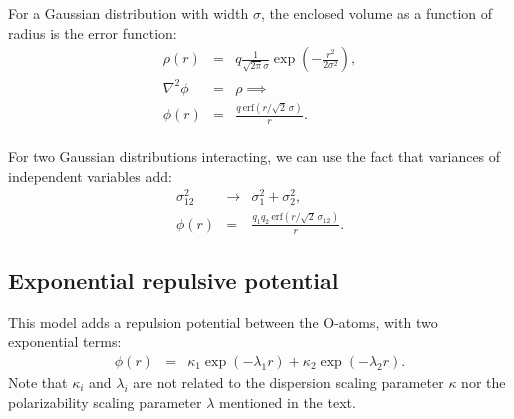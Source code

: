 \documentclass[aps,prb,amsmath,preprint,showpacs,letterpaper]{revtex4}
\newcommand{\grad}{\nabla}
\begin{document}
For a Gaussian distribution with width $\sigma$, the enclosed volume as a function
of radius is the error function:
\begin{eqnarray*}
  \rho(r) &=& q \tfrac{1}{\sqrt{2\pi}\sigma} \exp\left(-\tfrac{r^2}{2\sigma^2}\right), \\
  \grad^2\phi &=& \rho \implies \\
  \phi(r) &=& \frac{q\:\text{erf}(r/\sqrt{2}\,\sigma)}{r}. \\
\end{eqnarray*}

For two Gaussian distributions interacting, we can use the fact that variances
of independent variables add: 
\begin{eqnarray*}
  \sigma_{12}^2 &\to& \sigma_1^2 + \sigma_2^2, \\
  \phi(r) &=& \frac{q_1 q_2 \: \text{erf}(r/\sqrt{2}\,\sigma_{12})}{r}. 
\end{eqnarray*}

\subsection{Exponential repulsive potential}

This model adds a repulsion potential between the O-atoms, 
with two exponential terms:
\begin{eqnarray*}
  \phi(r) &=& \kappa_1\exp(-\lambda_1 r) + \kappa_2\exp(-\lambda_2 r).
\end{eqnarray*}
Note that $\kappa_i$ and $\lambda_i$ are not related to the dispersion scaling
parameter $\kappa$ nor the polarizability scaling parameter $\lambda$
mentioned in the text.


%

\end{document}
